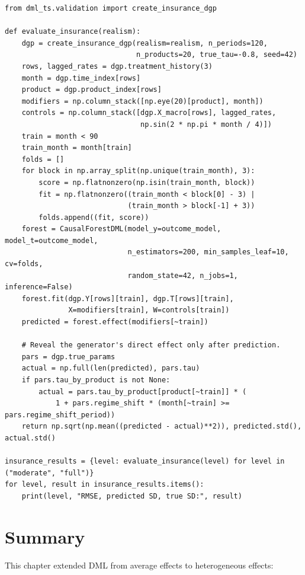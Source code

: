\begin{verbatim}
from dml_ts.validation import create_insurance_dgp

def evaluate_insurance(realism):
    dgp = create_insurance_dgp(realism=realism, n_periods=120,
                               n_products=20, true_tau=-0.8, seed=42)
    rows, lagged_rates = dgp.treatment_history(3)
    month = dgp.time_index[rows]
    product = dgp.product_index[rows]
    modifiers = np.column_stack([np.eye(20)[product], month])
    controls = np.column_stack([dgp.X_macro[rows], lagged_rates,
                                np.sin(2 * np.pi * month / 4)])
    train = month < 90
    train_month = month[train]
    folds = []
    for block in np.array_split(np.unique(train_month), 3):
        score = np.flatnonzero(np.isin(train_month, block))
        fit = np.flatnonzero((train_month < block[0] - 3) |
                             (train_month > block[-1] + 3))
        folds.append((fit, score))
    forest = CausalForestDML(model_y=outcome_model, model_t=outcome_model,
                             n_estimators=200, min_samples_leaf=10, cv=folds,
                             random_state=42, n_jobs=1, inference=False)
    forest.fit(dgp.Y[rows][train], dgp.T[rows][train],
               X=modifiers[train], W=controls[train])
    predicted = forest.effect(modifiers[~train])

    # Reveal the generator's direct effect only after prediction.
    pars = dgp.true_params
    actual = np.full(len(predicted), pars.tau)
    if pars.tau_by_product is not None:
        actual = pars.tau_by_product[product[~train]] * (
            1 + pars.regime_shift * (month[~train] >= pars.regime_shift_period))
    return np.sqrt(np.mean((predicted - actual)**2)), predicted.std(), actual.std()

insurance_results = {level: evaluate_insurance(level) for level in ("moderate", "full")}
for level, result in insurance_results.items():
    print(level, "RMSE, predicted SD, true SD:", result)
\end{verbatim}


\section{Summary}\label{sec:ch09_summary}

This chapter extended DML from average effects to heterogeneous effects:

